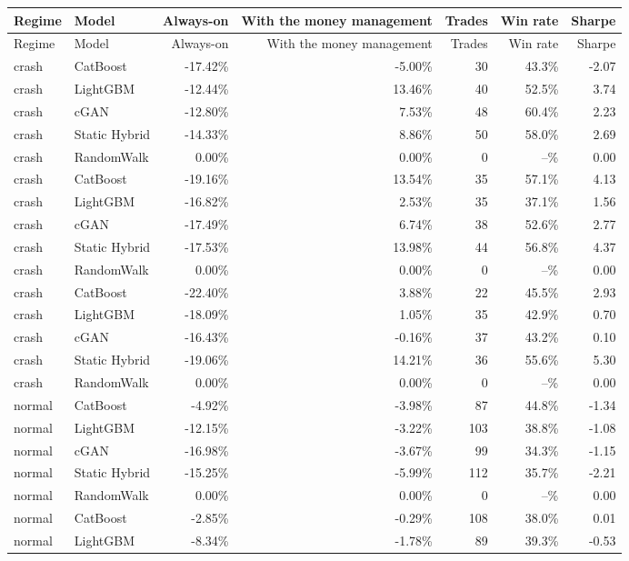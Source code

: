 \documentclass[11pt,a4paper]{article}
\begin{document}
\begin{center}\small
\begin{longtable}{llrrrrr}
\toprule
Regime & Model & Always-on & With the money management & Trades & Win rate & Sharpe \\
\midrule
\endfirsthead
\toprule
Regime & Model & Always-on & With the money management & Trades & Win rate & Sharpe \\
\midrule
\endhead
crash & CatBoost & -17.42\% & -5.00\% & 30 & 43.3\% & -2.07 \\
crash & LightGBM & -12.44\% & 13.46\% & 40 & 52.5\% & 3.74 \\
crash & cGAN & -12.80\% & 7.53\% & 48 & 60.4\% & 2.23 \\
crash & Static Hybrid & -14.33\% & 8.86\% & 50 & 58.0\% & 2.69 \\
crash & RandomWalk & 0.00\% & 0.00\% & 0 & --\% & 0.00 \\
crash & CatBoost & -19.16\% & 13.54\% & 35 & 57.1\% & 4.13 \\
crash & LightGBM & -16.82\% & 2.53\% & 35 & 37.1\% & 1.56 \\
crash & cGAN & -17.49\% & 6.74\% & 38 & 52.6\% & 2.77 \\
crash & Static Hybrid & -17.53\% & 13.98\% & 44 & 56.8\% & 4.37 \\
crash & RandomWalk & 0.00\% & 0.00\% & 0 & --\% & 0.00 \\
crash & CatBoost & -22.40\% & 3.88\% & 22 & 45.5\% & 2.93 \\
crash & LightGBM & -18.09\% & 1.05\% & 35 & 42.9\% & 0.70 \\
crash & cGAN & -16.43\% & -0.16\% & 37 & 43.2\% & 0.10 \\
crash & Static Hybrid & -19.06\% & 14.21\% & 36 & 55.6\% & 5.30 \\
crash & RandomWalk & 0.00\% & 0.00\% & 0 & --\% & 0.00 \\
normal & CatBoost & -4.92\% & -3.98\% & 87 & 44.8\% & -1.34 \\
normal & LightGBM & -12.15\% & -3.22\% & 103 & 38.8\% & -1.08 \\
normal & cGAN & -16.98\% & -3.67\% & 99 & 34.3\% & -1.15 \\
normal & Static Hybrid & -15.25\% & -5.99\% & 112 & 35.7\% & -2.21 \\
normal & RandomWalk & 0.00\% & 0.00\% & 0 & --\% & 0.00 \\
normal & CatBoost & -2.85\% & -0.29\% & 108 & 38.0\% & 0.01 \\
normal & LightGBM & -8.34\% & -1.78\% & 89 & 39.3\% & -0.53 \\

\end{longtable}
\end{center}
\end{document}
